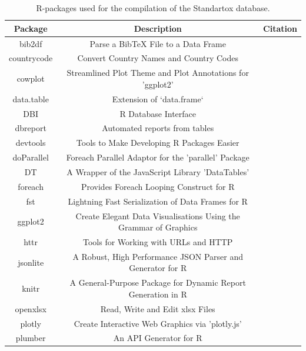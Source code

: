 \documentclass[journal,datadescriptor,submit,moreauthors,pdftex]{Definitions/mdpi}
\begin{document}
\section{}

\begin{table}[H]
    \caption{R-packages used for the compilation of the Standartox database.}
    \label{tab:rpackages}
    \centering
\begin{tabular}{ccc}
\toprule
\textbf{Package} & \textbf{Description} & \textbf{Citation} \\ 
\midrule
bib2df & Parse a BibTeX File to a Data Frame & \citep{R-bib2df} \\
countrycode & Convert Country Names and Country Codes & \citep{R-countrycode} \\
cowplot & Streamlined Plot Theme and Plot Annotations for 'ggplot2' & \citep{R-cowplot} \\
data.table & Extension of `data.frame` & \citep{R-data.table} \\
DBI & R Database Interface & \citep{R-DBI} \\
dbreport & Automated reports from tables & \citep{R-dbreport} \\
devtools & Tools to Make Developing R Packages Easier & \citep{R-devtools} \\
doParallel & Foreach Parallel Adaptor for the 'parallel' Package & \citep{R-doParallel} \\
DT & A Wrapper of the JavaScript Library 'DataTables' & \citep{R-DT} \\
foreach & Provides Foreach Looping Construct for R & \citep{R-foreach} \\
fst & Lightning Fast Serialization of Data Frames for R & \citep{R-fst} \\
ggplot2 & Create Elegant Data Visualisations Using the Grammar of Graphics & \citep{R-ggplot2} \\ httr & Tools for Working with URLs and HTTP & \citep{R-httr} \\
jsonlite & A Robust, High Performance JSON Parser and Generator for R & \citep{R-jsonlite} \\
knitr & A General-Purpose Package for Dynamic Report Generation in R & \citep{R-knitr} \\
openxlsx & Read, Write and Edit xlsx Files & \citep{R-openxlsx} \\
plotly & Create Interactive Web Graphics via 'plotly.js' & \citep{R-plotly} \\
plumber & An API Generator for R & \citep{R-plumber} \\

\end{tabular}
\end{table}
\end{document}
